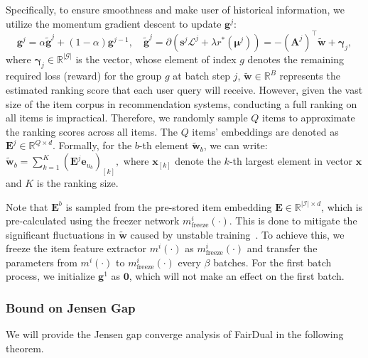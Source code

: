 Specifically, to ensure smoothness and make user of historical information, we utilize the momentum gradient descent to update $\bm{g}^j$:
\begin{equation}
    \bm{g}^j=\alpha \widetilde{\bm{g}}^j + (1-\alpha)\mathbf{g}^{j-1}, \quad \widetilde{\bm{g}}^j=\partial (\bm{s}^j\mathcal{L}^j + \lambda r^*(\bm{\mu}^j)) = -(\mathbf{A}^j)^{\top} \widetilde{\bm{w}}+ \bm{\gamma}_j,
\end{equation}
where $\bm{\gamma}_j\in\mathbb{R}^{|\mathcal{G}|}$ is the vector, whose element of index $g$ denotes the remaining required loss (\ie reward) for the group $g$ at batch step $j$, $\widetilde{\bm{w}}\in\mathbb{R}^{B}$ represents the estimated ranking score that each user query will receive. However, given the vast size of the item corpus in recommendation systems, conducting a full ranking on all items is impractical. Therefore, we randomly sample $Q$ items to approximate the ranking scores across all items. 
The $Q$ items' embeddings are denoted as $\bm{E}^j\in\mathbb{R}^{Q\times d}$. Formally, for the $b$-th element $\widetilde{\bm{w}}_b$, we can write:
$
    \widetilde{\bm{w}}_b = \sum_{k=1}^K (\bm{E}^j\bm{e}_{u_b})_{[k]},
$
where $\bm{x}_{[k]}$ denote the $k$-th largest element in vector $\bm{x}$ and $K$ is the ranking size. 


Note that $\bm{E}^b$ is sampled from the pre-stored item embedding $\bm{E}\in\mathbb{R}^{|\mathcal{I}|\times d}$, which is pre-calculated using the freezer network $m_{\text{freeze}}^i(\cdot)$. This is done to mitigate the significant fluctuations in $\widetilde{\bm{w}}$ caused by unstable training~\citep{fan2020theoretical}. To achieve this, we freeze the item feature extractor $m^i(\cdot)$ as $m_{\text{freeze}}^i(\cdot)$ and transfer the parameters from $m^i(\cdot)$ to $m_{\text{freeze}}^i(\cdot)$ every $\beta$ batches. For the first batch process, we initialize $\bm{g}^1$ as $\bm{0}$, which will not make an effect on the first batch.


\subsubsection{Bound on Jensen Gap}\label{sec:bound}
We will provide the Jensen gap converge analysis of FairDual in the following theorem.


